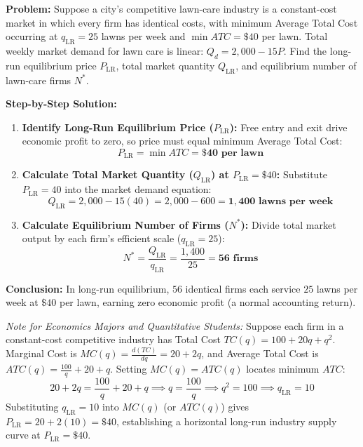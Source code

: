 \documentclass[11pt,letterpaper]{article}
\begin{document}
\begin{tcolorbox}[colback=LightSlate,colframe=SlateBlue,title=\textbf{Work It Out: Long-Run Industry Equilibrium in Lawn Care}]
\noindent\textbf{Problem:} Suppose a city's competitive lawn-care industry is a constant-cost market in which every firm has identical costs, with minimum Average Total Cost occurring at $q_{\text{LR}} = 25$ lawns per week and $\min ATC = \$40$ per lawn. Total weekly market demand for lawn care is linear: $Q_d = 2{,}000 - 15P$. Find the long-run equilibrium price $P_{\text{LR}}$, total market quantity $Q_{\text{LR}}$, and equilibrium number of lawn-care firms $N^*$.

\medskip
\noindent\textbf{Step-by-Step Solution:}
\begin{enumerate}
    \item \textbf{Identify Long-Run Equilibrium Price ($P_{\text{LR}}$):}
    Free entry and exit drive economic profit to zero, so price must equal minimum Average Total Cost:
    \[
    P_{\text{LR}} = \min ATC = \mathbf{\$40\text{ per lawn}}
    \]

    \item \textbf{Calculate Total Market Quantity ($Q_{\text{LR}}$) at $P_{\text{LR}} = \$40$:}
    Substitute $P_{\text{LR}} = 40$ into the market demand equation:
    \[
    Q_{\text{LR}} = 2{,}000 - 15(40) = 2{,}000 - 600 = \mathbf{1{,}400\text{ lawns per week}}
    \]

    \item \textbf{Calculate Equilibrium Number of Firms ($N^*$):}
    Divide total market output by each firm's efficient scale ($q_{\text{LR}} = 25$):
    \[
    N^* = \frac{Q_{\text{LR}}}{q_{\text{LR}}} = \frac{1{,}400}{25} = \mathbf{56\text{ firms}}
    \]
\end{enumerate}
\textbf{Conclusion:} In long-run equilibrium, $56$ identical firms each service $25$ lawns per week at $\$40$ per lawn, earning zero economic profit (a normal accounting return).
\end{tcolorbox}

\begin{tcolorbox}[colback=LightSlate,colframe=CourseBlue,title=\textbf{Optional Advanced Section: Calculus Derivation of Long-Run Supply}]
\small
\emph{Note for Economics Majors and Quantitative Students:}
Suppose each firm in a constant-cost competitive industry has Total Cost $TC(q) = 100 + 20q + q^2$. Marginal Cost is $MC(q) = \frac{d(TC)}{dq} = 20 + 2q$, and Average Total Cost is $ATC(q) = \frac{100}{q} + 20 + q$. Setting $MC(q) = ATC(q)$ locates minimum $ATC$:
\[
20 + 2q = \frac{100}{q} + 20 + q \implies q = \frac{100}{q} \implies q^2 = 100 \implies q_{\text{LR}} = 10
\]
Substituting $q_{\text{LR}} = 10$ into $MC(q)$ (or $ATC(q)$) gives $P_{\text{LR}} = 20 + 2(10) = \$40$, establishing a horizontal long-run industry supply curve at $P_{\text{LR}} = \$40$.
\end{tcolorbox}
\end{document}
